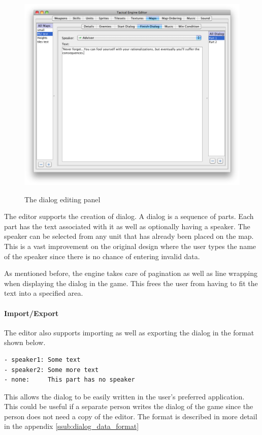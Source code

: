 \begin{figure}[htbp]
	\centering
		\includegraphics[height=4in]{figures/editor/Maps-dialog.png}
	\caption{The dialog editing panel}
	\label{fig:figures_editor_Maps-dialog}
\end{figure}
The editor supports the creation of dialog.  A dialog is a sequence of parts. Each part has the text  associated with it as well as optionally having a speaker.  The speaker can be selected from any unit that has already been placed on the map. This is a vast improvement on the original design where the user types the name of the speaker since there is no chance of entering invalid data.

As mentioned before, the engine takes care of pagination as well as line wrapping when displaying the dialog in the game. This frees the user from having to fit the text into a specified area. 

\paragraph{Import/Export\\}
The editor also supports importing as well as exporting the dialog in the format shown below. 
\begin{lstlisting}[caption=Shows the format used  for the dialog]
- speaker1: Some text 
- speaker2: Some more text
- none:     This part has no speaker
\end{lstlisting}
This allows the dialog to be easily written in the user's preferred application.  This could be useful if a  separate person writes the dialog of the game since the person does not need a copy of the editor. The format is described in more detail in the appendix \ref{ssub:dialog_data_format}  

